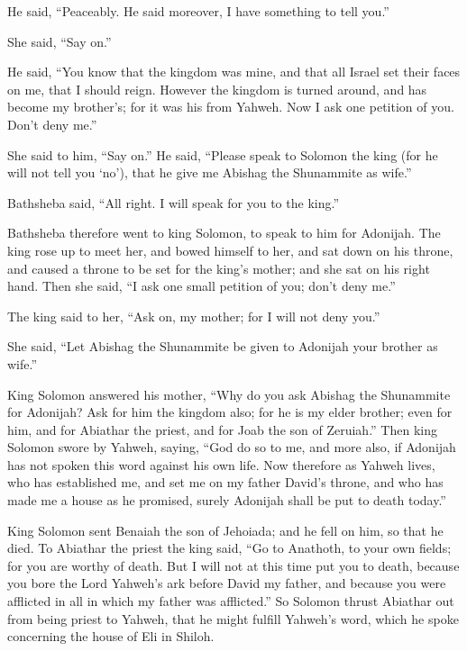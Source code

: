 {\par }{\PP He said, “Peaceably.
He said moreover, I have something to tell you.”
\par }{\PP She said, “Say on.”
\par }{\PP {}He said, “You know that the kingdom was mine, and that all Israel set their faces on me, that I should reign. However the kingdom is turned around, and has become my brother’s; for it was his from Yahweh.
Now I ask one petition of you. Don’t deny me.”
\par }{\PP She said to him, “Say on.”
He said, “Please speak to Solomon the king (for he will not tell you ‘no’), that he give me Abishag the Shunammite as wife.”
\par }{\PP {}Bathsheba said, “All right. I will speak for you to the king.”
\par }{\PP {}Bathsheba therefore went to king Solomon, to speak to him for Adonijah. The king rose up to meet her, and bowed himself to her, and sat down on his throne, and caused a throne to be set for the king’s mother; and she sat on his right hand.
Then she said, “I ask one small petition of you; don’t deny me.”
\par }{\PP The king said to her, “Ask on, my mother; for I will not deny you.”
\par }{\PP {}She said, “Let Abishag the Shunammite be given to Adonijah your brother as wife.”
\par }{\PP {}King Solomon answered his mother, “Why do you ask Abishag the Shunammite for Adonijah? Ask for him the kingdom also; for he is my elder brother; even for him, and for Abiathar the priest, and for Joab the son of Zeruiah.”
Then king Solomon swore by Yahweh, saying, “God do so to me, and more also, if Adonijah has not spoken this word against his own life.
Now therefore as Yahweh lives, who has established me, and set me on my father David’s throne, and who has made me a house as he promised, surely Adonijah shall be put to death today.”
\par }{\PP {}King Solomon sent Benaiah the son of Jehoiada; and he fell on him, so that he died.
To Abiathar the priest the king said, “Go to Anathoth, to your own fields; for you are worthy of death. But I will not at this time put you to death, because you bore the Lord Yahweh’s ark before David my father, and because you were afflicted in all in which my father was afflicted.”
So Solomon thrust Abiathar out from being priest to Yahweh, that he might fulfill Yahweh’s word, which he spoke concerning the house of Eli in Shiloh.
}
